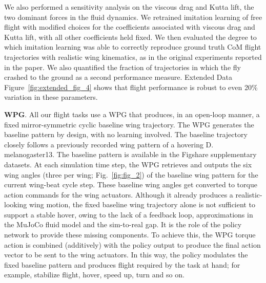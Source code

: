 \documentclass[sn-mathphys-num]{sn-jnl}%
\theoremstyle{thmstyleone}	%
\theoremstyle{thmstyletwo}	%
\theoremstyle{thmstylethree}	%
\begin{document}
We also performed a sensitivity analysis on the viscous drag and Kutta lift, the two dominant forces in the fluid dynamics. 
We retrained imitation learning of free flight with modified choices for the coefficients associated with viscous drag and Kutta lift, with all other coefficients held fixed. 
We then evaluated the degree to which imitation learning was able to correctly reproduce ground truth CoM flight trajectories with realistic wing kinematics, as in the original experiments reported in the paper. 
We also quantified the fraction of trajectories in which the fly crashed to the ground as a second performance measure. 
Extended Data Figure~\ref{fig:extended_fig_4} shows that flight performance is robust to even 20\% variation in these parameters.


\textbf{WPG}. 
All our flight tasks use a WPG that produces, in an open-loop manner, a fixed mirror-symmetric cyclic baseline wing trajectory. 
The WPG generates the baseline pattern by design, with no learning involved. 
The baseline trajectory closely follows a previously recorded wing pattern of a hovering D. melanogaster13. 
The baseline pattern is available in the Figshare supplementary datasets\cite{vaxenburg2025whole}. 
At each simulation time step, the WPG retrieves and outputs the six wing angles (three per wing; Fig.~\ref{fig:fig_2}) of the baseline wing pattern for the current wing-beat cycle step. 
These baseline wing angles get converted to torque action commands for the wing actuators. 
Although it already produces a realistic-looking wing motion, the fixed baseline wing trajectory alone is not sufficient to support a stable hover, owing to the lack of a feedback loop, approximations in the MuJoCo fluid model and the sim-to-real gap. 
It is the role of the policy network to provide these missing components. 
To achieve this, the WPG torque action is combined (additively) with the policy output to produce the final action vector to be sent to the wing actuators. 
In this way, the policy modulates the fixed baseline pattern and produces flight required by the task at hand; 
for example, stabilize flight, hover, speed up, turn and so on.
\end{document}
